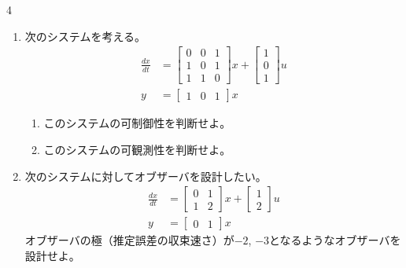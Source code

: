 \documentclass[fleqn]{article}
\renewcommand{\bmatrix}{\left[\begin{array}}
\newcommand{\ematrix}{\end{array}\right]}
\begin{document}
\begin{multicols}{4}
\begin{enumerate}





\item
次のシステムを考える。
\begin{align}
	\frac{dx}{dt}
	&=	\bmatrix{ccc}
			0 & 0 & 1\\
			1 & 0 & 1\\
			1 & 1 & 0
		\ematrix
		x
		+
		\bmatrix{c}
			1 \\
			0 \\
			1 
		\ematrix
		u
\nonumber \\
	y 
	&=	\bmatrix{ccc}
			1 & 0 & 1
		\ematrix
		x
\nonumber 
\end{align}


\begin{enumerate}

\item
このシステムの可制御性を判断せよ。
\vspace{11.5cm}

\item
このシステムの可観測性を判断せよ。
\vspace{11.5cm}
\end{enumerate}
\vfill\null
\columnbreak






\item
次のシステムに対してオブザーバを設計したい。
\begin{align}
	\frac{dx}{dt}
	&=	\bmatrix{cc}
			0 & 1 \\
			1 & 2
		\ematrix
		x
		+
		\bmatrix{c}
			1 \\
			2 
		\ematrix
		u
\nonumber \\
	y 
	&=	\bmatrix{cc}
			0 & 1 
		\ematrix
		x
\nonumber 
\end{align}
オブザーバの極（推定誤差の収束速さ）が$-2$, $-3$となるようなオブザーバを設計せよ。
\vfill\null
\columnbreak







\end{enumerate}
\end{multicols}
\end{document}
